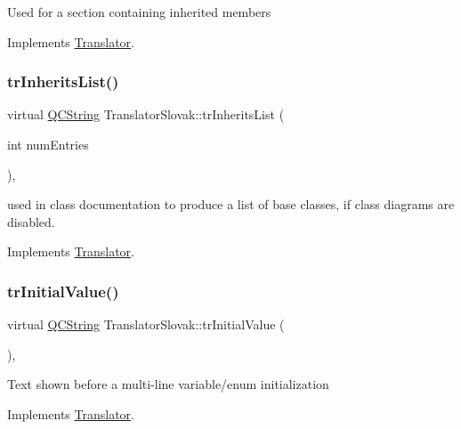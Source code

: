 Used for a section containing inherited members 

Implements \mbox{\hyperlink{class_translator}{Translator}}.

\mbox{\label{class_translator_slovak_a8b048eac4e3bbb6c3c16ee7218c214e3}} 
\subsubsection{\texorpdfstring{trInheritsList()}{trInheritsList()}}
{\footnotesize\ttfamily virtual \mbox{\hyperlink{class_q_c_string}{Q\+C\+String}} Translator\+Slovak\+::tr\+Inherits\+List (\begin{DoxyParamCaption}\item[{int}]{num\+Entries }\end{DoxyParamCaption})\hspace{0.3cm}{\ttfamily [inline]}, {\ttfamily [virtual]}}

used in class documentation to produce a list of base classes, if class diagrams are disabled. 

Implements \mbox{\hyperlink{class_translator}{Translator}}.

\mbox{\label{class_translator_slovak_a61fb99fe7bb25a98ab56c71652894a34}} 
\subsubsection{\texorpdfstring{trInitialValue()}{trInitialValue()}}
{\footnotesize\ttfamily virtual \mbox{\hyperlink{class_q_c_string}{Q\+C\+String}} Translator\+Slovak\+::tr\+Initial\+Value (\begin{DoxyParamCaption}{ }\end{DoxyParamCaption})\hspace{0.3cm}{\ttfamily [inline]}, {\ttfamily [virtual]}}

Text shown before a multi-\/line variable/enum initialization 

Implements \mbox{\hyperlink{class_translator}{Translator}}.

\mbox{\label{class_translator_slovak_a3dae7d2d5403edb2eee05d9f545175d6}} 
